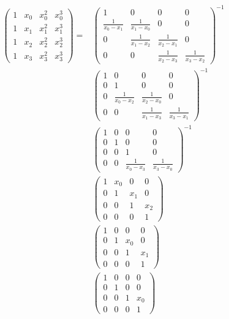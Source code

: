\documentclass[11pt]{article}
\begin{document}
\begin{align*}
\left(\begin{matrix}1 & x_{0} & x_{0}^{2} & x_{0}^{3}\\1 & x_{1} & x_{1}^{2} & x_{1}^{3}\\1 & x_{2} & x_{2}^{2} & x_{2}^{3}\\1 & x_{3} & x_{3}^{2} & x_{3}^{3}\end{matrix}\right)
=& \left(\begin{matrix}1&0&0&0\\\frac{1}{x_{0}-x_{1}}&\frac{1}{x_{1}-x_{0}}&0&0\\0&\frac{1}{x_{1}-x_{2}}&\frac{1}{x_{2}-x_{1}}&0\\0&0&\frac{1}{x_{2}-x_{3}}&\frac{1}{x_{3}-x_{2}}\end{matrix}\right)^{-1} \\
 & \left(\begin{matrix}1&0&0&0\\0&1&0&0\\0&\frac{1}{x_{0}-x_{2}}&\frac{1}{x_{2}-x_{0}}&0\\0&0&\frac{1}{x_{1}-x_{3}}&\frac{1}{x_{3}-x_{1}}\end{matrix}\right)^{-1} \\
 & \left(\begin{matrix}1&0&0&0\\0&1&0&0\\0&0&1&0\\0&0&\frac{1}{x_{0}-x_{3}}&\frac{1}{x_{3}-x_{0}}\end{matrix}\right)^{-1} \\
 & \left(\begin{matrix}1&x_{0}&0&0\\0&1&x_{1}&0\\0&0&1&x_{2}\\0&0&0&1\end{matrix}\right) \\
 & \left(\begin{matrix}1&0&0&0\\0&1&x_{0}&0\\0&0&1&x_{1}\\0&0&0&1\end{matrix}\right) \\
 & \left(\begin{matrix}1&0&0&0\\0&1&0&0\\0&0&1&x_{0}\\0&0&0&1\end{matrix}\right) 
\end{align*}
\end{document}

